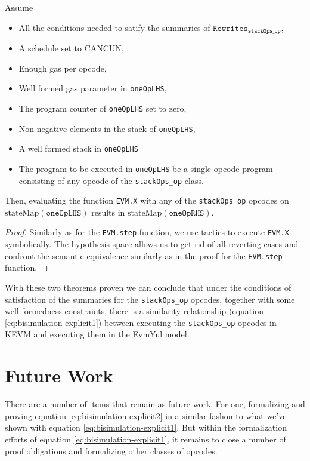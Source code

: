 \begin{theorem}[X_oneOp]\label{thm:X_oneOp}
\leanok
{}

Assume

\begin{itemize}
\item All the conditions needed to satify the summaries of
  $\texttt{Rewrites}_{\texttt{stackOps_op}}$,
\item A schedule set to CANCUN,
\item Enough gas per opcode,
\item Well formed gas parameter in \texttt{oneOpLHS},
\item The program counter of \texttt{oneOpLHS} set to zero,
\item Non-negative elements in the stack of \texttt{oneOpLHS},
\item A well formed stack in \texttt{oneOpLHS}
\item The program to be executed in \texttt{oneOpLHS} be a single-opcode program
  consisting of any opcode of the \texttt{stackOps_op} class.
\end{itemize}

Then, evaluating the function \texttt{EVM.X} with any of the
\texttt{stackOps_op} opcodes on $\text{stateMap}(\texttt{oneOpLHS})$ results in
$\text{stateMap}(\texttt{oneOpRHS})$.

\end{theorem}

\begin{proof}

Similarly as for the \texttt{EVM.step} function, we use tactics to execute
\texttt{EVM.X} symbolically. The hypothesis space allows us to get rid of all
reverting cases and confront the semantic equivalence similarly as in the proof
for the \texttt{EVM.step} function.

\end{proof}

With these two theorems proven we can conclude that under the conditions of
satisfaction of the summaries for the \texttt{stackOps_op} opcodes, together
with some well-formedness constraints, there is a similarity relationship
(equation \ref{eq:bisimulation-explicit1}) between executing the
\texttt{stackOps_op} opcodes in KEVM and executing them in the EvmYul model.

\section{Future Work}

There are a number of items that remain as future work. For one, formalizing and
proving equation \ref{eq:bisimulation-explicit2} in a similar fashon to what
we've shown with equation \ref{eq:bisimulation-explicit1}.
But within the formalization efforts of equation
\ref{eq:bisimulation-explicit1}, it remains to close a number of proof
obligations and formalizing other classes of opcodes.

